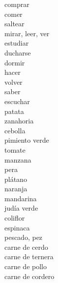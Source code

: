 \documentclass[13pt]{article}
\begin{document}
\rubylatin
\renewcommand{\rubysep}{-1.2ex}
\renewcommand{\rubysize}{0.5}

\begin{CJK*}{UTF8}{}
\begin{multicols}{2}
\LARGE
{}
\noindent
{}\quad comprar\\
\quad comer\\
\quad saltear\\
\quad mirar, leer, ver\\
\quad estudiar\\
\quad ducharse\\
\quad dormir\\
\quad hacer\\
\quad volver\\
\quad saber\\
\quad escuchar\\
\quad patata\\
\quad zanahoria\\
\quad cebolla\\
\quad pimiento verde\\
\quad tomate\\
\quad manzana\\
\quad pera\\
\quad plátano\\
\quad naranja\\
\quad mandarina\\
\quad judía verde\\
\quad coliflor\\
\quad espinaca\\
\quad pescado, pez\\
\quad carne de cerdo\\
\quad carne de ternera\\
\quad carne de pollo\\
\quad carne de cordero\\


\end{multicols}
\end{CJK*}
\end{document}
